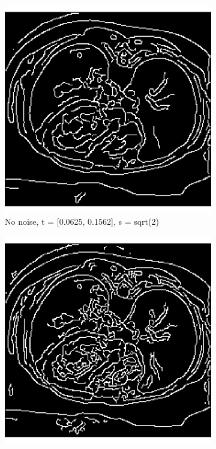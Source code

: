 \begin{figure}[H]
  \centering
  
  \begin{subfigure}{.5\textwidth}
    \centering
    \includegraphics[width=.9\textwidth]{./canny1/no_noise_t_00625_01562}
    \caption{No noise, t = [0.0625, 0.1562], s = sqrt(2)}
    \label{fig:cany_no_noise_default}
  \end{subfigure}%
  \begin{subfigure}{.5\textwidth}
    \centering
    \includegraphics[width=.9\textwidth]{./canny1/no_noise_s_srt_1}

\end{subfigure}
\end{figure}
